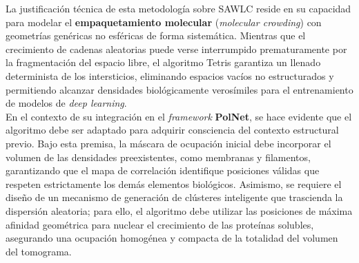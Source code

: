 La justificación técnica de esta metodología sobre SAWLC reside en su capacidad para modelar el \textbf{empaquetamiento molecular} (\textit{molecular crowding}) con geometrías genéricas no esféricas de forma sistemática. Mientras que el crecimiento de cadenas aleatorias puede verse interrumpido prematuramente por la fragmentación del espacio libre, el algoritmo Tetris garantiza un llenado determinista de los intersticios, eliminando espacios vacíos no estructurados y permitiendo alcanzar densidades biológicamente verosímiles para el entrenamiento de modelos de \textit{deep learning}.\\

En el contexto de su integración en el \textit{framework} \textbf{PolNet}, se hace evidente que el algoritmo debe ser adaptado para adquirir consciencia del contexto estructural previo. Bajo esta premisa, la máscara de ocupación inicial debe incorporar el volumen de las densidades preexistentes, como membranas y filamentos, garantizando que el mapa de correlación identifique posiciones válidas que respeten estrictamente los demás elementos biológicos. Asimismo, se requiere el diseño de un mecanismo de generación de clústeres inteligente que trascienda la dispersión aleatoria; para ello, el algoritmo debe utilizar las posiciones de máxima afinidad geométrica para nuclear el crecimiento de las proteínas solubles, asegurando una ocupación homogénea y compacta de la totalidad del volumen del tomograma.


